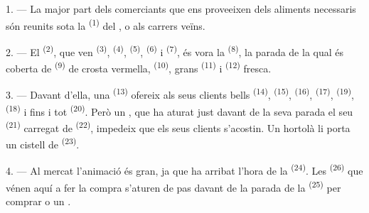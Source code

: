 
\VUsaut{4.0mm}
\VUsaut{3.0mm}

\VUsaut{3.0mm}

1. --- La major part dels comerciants que ens proveeixen dels aliments necessaris són reunits
sota la  \textsuperscript{(1)} del , o als carrers veïns.

2. --- El  \textsuperscript{(2)}, que ven 
\textsuperscript{(3)},  \textsuperscript{(4)},
 \textsuperscript{(5)}, 
\textsuperscript{(6)} i  \textsuperscript{(7)}, és vora la
 \textsuperscript{(8)}, la parada de la qual
és coberta de  \textsuperscript{(9)} de crosta vermella,
 \textsuperscript{(10)}, grans 
\textsuperscript{(11)} i  \textsuperscript{(12)} fresca.

3. --- Davant d'ella, una  \textsuperscript{(13)} ofereix als seus clients
bells  \textsuperscript{(14)},  \textsuperscript{(15)},
 \textsuperscript{(16)},  \textsuperscript{(17)},
 \textsuperscript{(19)},
 \textsuperscript{(18)} i fins i tot 
\textsuperscript{(20)}. Però un , que ha aturat just davant de la seva parada
el seu  \textsuperscript{(21)} carregat de
 \textsuperscript{(22)}, impedeix que els seus clients
s'acostin. Un hortolà li porta un cistell de  \textsuperscript{(23)}.

\VUsaut{4.0mm}
\VUsaut{3.0mm}

4. --- Al mercat l'animació és gran, ja que ha arribat l'hora de la
 \textsuperscript{(24)}. Les 
\textsuperscript{(26)} que vénen aquí a fer la compra s'aturen de pas davant de la parada de
la  \textsuperscript{(25)} per comprar  o un
.

